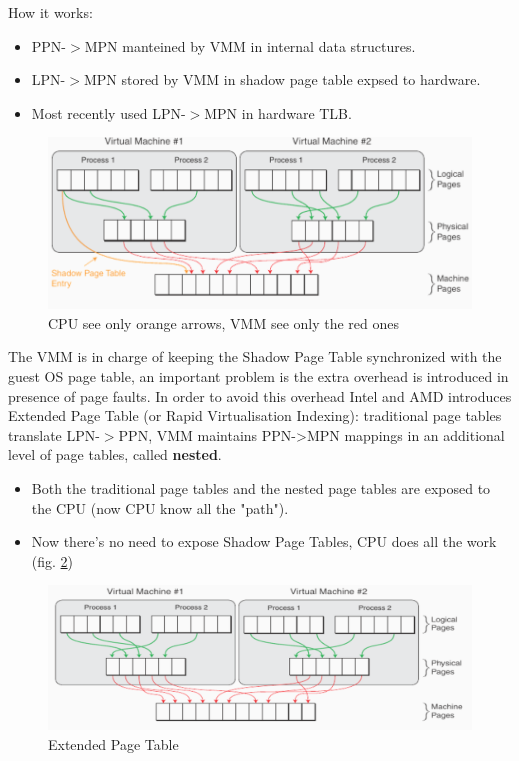 How it works:
\begin{itemize}
    \item PPN-$>$MPN manteined by VMM in internal data structures.
    \item LPN-$>$MPN stored by VMM in shadow page table expsed to hardware.
    \item Most recently used LPN-$>$MPN in hardware TLB.
\end{itemize}
\begin{figure}
    \centering
    \includegraphics[scale=0.3]{images/mapping2_mm.png}
    \caption{CPU see only orange arrows, VMM see only the red ones}
    \label{fig:mapping2_mm}
\end{figure}
The VMM is in charge of keeping the Shadow Page Table synchronized with the guest OS page table, an important problem is the extra overhead is introduced in presence of page faults. In order to avoid this overhead Intel and AMD introduces Extended Page Table (or Rapid Virtualisation Indexing): traditional page tables translate LPN-$>$PPN, VMM maintains PPN->MPN mappings in an additional level of page tables, called \textbf{nested}.
\begin{itemize}
    \item Both the traditional page tables and the nested page tables are exposed to the CPU (now CPU know all the "path").
    \item Now there's no need to expose Shadow Page Tables, CPU does all the work (fig. \ref{fig:mapping3_mm})
\end{itemize}
\begin{figure}
    \centering
    \includegraphics[scale=0.3]{images/mapping3_mm.png}
    \caption{Extended Page Table}
    \label{fig:mapping3_mm}
\end{figure}
